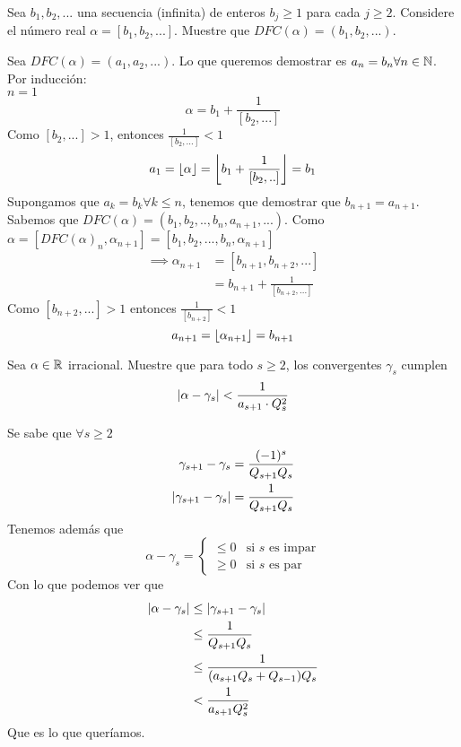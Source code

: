 \begin{prob}[5 pts.]
	Sea $b_1,b_2,...$ una secuencia (infinita) de enteros $b_j\geq1$ para cada $j\geq2$. Considere el número real $\alpha=[b_1,b_2,...]$. Muestre que $DFC(\alpha)=(b_1,b_2,...)$.
\end{prob}

\begin{sol}
	Sea $DFC(\alpha)=(a_1,a_2,...)$. Lo que queremos demostrar es $a_n=b_n \forall n\in\mathbb{N}$.\\
	Por inducción:\\
	$n=1$
	\[\alpha=b_1+\frac{1}{[b_2,...]}\]
	Como $[b_2,...]>1$, entonces $\frac{1}{[b_2,...]}<1$
	\[a_1=\left\lfloor\alpha\right\rfloor=\left\lfloor b_1+\frac{1}{[b_2,..]}\right\rfloor=b_1\]
	Supongamos que $a_k=b_k\forall k\leq n$, tenemos que demostrar que $b_{n+1}=a_{n+1}$. Sabemos que $DFC(\alpha)=(b_1,b_2,..,b_n,a_{n+1},...)$. Como $\alpha=[DFC(\alpha)_n,\alpha_{n+1}]=[b_1,b_2,...,b_n,\alpha_{n+1}]$
	\begin{align*}
		\implies \alpha_{n+1} & =[b_{n+1},b_{n+2},...]           \\
		                      & =b_{n+1}+\frac{1}{[b_{n+2},...]}
	\end{align*}
	Como $[b_{n+2},...]>1$ entonces $\frac{1}{[b_{n+2}]}<1$
	\begin{equation*}
		a_{n+1}=\left\lfloor\alpha_{n+1}\right\rfloor=b_{n+1}
	\end{equation*}
\end{sol}

\begin{prob}[5 pts.]
	Sea $\alpha\in\mathbb{R}$ irracional. Muestre que para todo $s\geq 2$, los convergentes $\gamma_s$ cumplen
	\[
		\left|\alpha-\gamma_s\right|<\frac{1}{a_{s+1}\cdot Q_s^2}
	\]
\end{prob}

\begin{sol}
	Se sabe que $\forall s\geq2$
	\begin{align*}
		\gamma_{s+1}-\gamma_s=\frac{(-1)^s}{Q_{s+1}Q_s} \\
		\left|\gamma_{s+1}-\gamma_s\right|=\frac1{Q_{s+1}Q_s}
	\end{align*}
	Tenemos además que
	\begin{equation*}
		\alpha-\gamma_s=\begin{cases}
			\leq0 & \text{si $s$ es impar} \\
			\geq0 & \text{si $s$ es par}
		\end{cases}
	\end{equation*}
	Con lo que podemos ver que
	\begin{align*}
		\left|\alpha-\gamma_s\right| & \leq\left|\gamma_{s+1}-\gamma_s\right|     \\
		                      & \leq\frac1{Q_{s+1}Q_s}              \\
		                      & \leq\frac1{(a_{s+1}Q_s+Q_{s-1})Q_s} \\
		                      & <\frac1{a_{s+1}Q_s^2}
	\end{align*}
	Que es lo que queríamos.
\end{sol}

